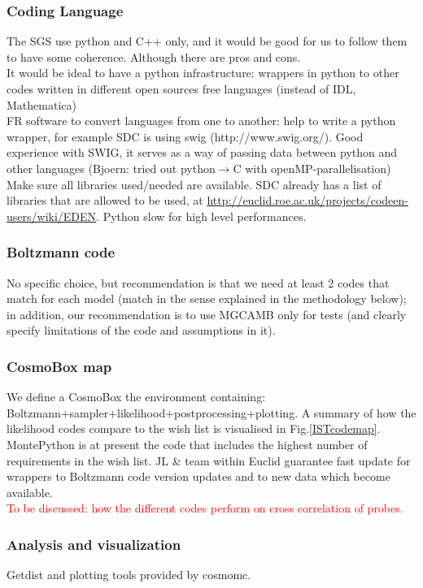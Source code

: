 \subsubsection{Coding Language}
The SGS use python and C++ only, and it would be good for us to follow them to have some coherence. Although there are pros and cons.\\
It would be ideal to have a python infrastructure: wrappers in python to other codes written in different open sources free languages (instead of IDL, Mathematica)\\
FR software to convert languages from one to another: help to write a python wrapper, for example SDC is using swig (http://www.swig.org/).
Good experience with SWIG, it serves as a way of passing data between python and other languages (Bjoern: tried out python$\rightarrow$C with openMP-parallelisation)\\
Make sure all libraries used/needed are available. 
SDC already has a list of libraries that are allowed to be used, at \url{http://euclid.roe.ac.uk/projects/codeen-users/wiki/EDEN}.
Python slow for high level performances. 

\subsubsection{Boltzmann code}

No specific choice, but recommendation is that we need at least 2 codes that match for each model (match in the sense explained in the methodology below); 
in addition, our recommendation is to use MGCAMB only for tests (and clearly specify limitations of the code and assumptions in it).


\subsubsection{CosmoBox map}
We define a CosmoBox the environment containing: Boltzmann+sampler+likelihood+postprocessing+plotting. A summary of how the likelihood codes compare to the wish list is visualised in Fig.\ref{ISTcodemap}. MontePython is at present the code that includes the highest number of requirements in the wish list. JL \& team within Euclid guarantee fast 
update for wrappers to Boltzmann code version updates and to new data which become available. \\
\textcolor{red}{To be discussed: how the different codes perform on cross correlation of probes.}

\subsubsection{Analysis and visualization}
Getdist and plotting tools provided by cosmomc.

